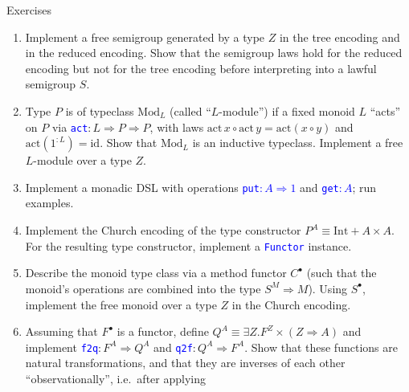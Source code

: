 \documentclass[english,,russian]{beamer}
\begin{document}
\begin{frame}{Exercises}
\begin{enumerate}
\item {\footnotesize{}\vspace{-0.2cm}Implement a free semigroup generated
by a type $Z$ in the tree encoding and in the reduced encoding. Show
that the semigroup laws hold for the reduced encoding but not for
the tree encoding before interpreting into a lawful semigroup $S$.}{\footnotesize\par}
\item {\footnotesize{}Type $P$ is of typeclass $\text{Mod}_{L}$ (called
``$L$-module'') if a fixed monoid $L$ ``acts'' on $P$ via }\texttt{\textcolor{blue}{\footnotesize{}act}}{\footnotesize{}$:L\Rightarrow P\Rightarrow P$,
with laws $\text{act}\,x\circ\text{act}\,y=\text{act}\left(x\circ y\right)$
and $\text{act}\left(1^{:L}\right)=\text{id}$. Show that $\text{Mod}_{L}$
is an inductive typeclass. Implement a free $L$-module over a type
$Z$. }{\footnotesize\par}
\item {\footnotesize{}Implement a monadic DSL with operations }\texttt{\textcolor{blue}{\footnotesize{}put$:A\Rightarrow1$}}{\footnotesize{}
and }\texttt{\textcolor{blue}{\footnotesize{}get$:A$}}{\footnotesize{};
run examples.}{\footnotesize\par}
\item {\footnotesize{}Implement the Church encoding of the type constructor
$P^{A}\equiv\text{Int}+A\times A$. For the resulting type constructor,
implement a }\texttt{\textcolor{blue}{\footnotesize{}Functor}}{\footnotesize{}
instance.}{\footnotesize\par}
\item {\footnotesize{}Describe the monoid type class via a method functor
$C^{\bullet}$ (such that the monoid's operations are combined into
the type $S^{M}\Rightarrow M$). Using $S^{\bullet}$, implement the
free monoid over a type $Z$ in the Church encoding.}{\footnotesize\par}
\item {\footnotesize{}Assuming that $F^{\bullet}$ is a functor, define
$Q^{A}\equiv\exists Z.F^{Z}\times\left(Z\Rightarrow A\right)$ and
implement }\texttt{\textcolor{blue}{\footnotesize{}f2q}}{\footnotesize{}$:F^{A}\Rightarrow Q^{A}$
and }\texttt{\textcolor{blue}{\footnotesize{}q2f}}{\footnotesize{}$:Q^{A}\Rightarrow F^{A}$.
Show that these functions are natural transformations, and that they
are inverses of each other ``observationally'', i.e.~after applying
}
\end{enumerate}
\end{frame}
\end{document}
